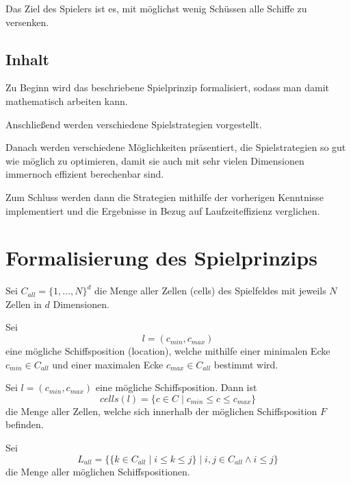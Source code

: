 \documentclass[a4paper,12pt]{llncs}
\numberwithin{equation}{section}
\newcommand{\bildbreite}[5]{
  \begin{figure}[htbp]
    \begin{center}
      \texttt{[image: \#1]}
      \caption[#5]{#4}
      \label{#3}
    \end{center}
  \end{figure}
}
\begin{document}
Das Ziel des Spielers ist es, mit möglichst wenig Schüssen alle Schiffe zu versenken.


\subsection{Inhalt}
Zu Beginn wird das beschriebene Spielprinzip formalisiert, sodass man damit mathematisch arbeiten kann.

Anschließend werden verschiedene Spielstrategien vorgestellt.

Danach werden verschiedene Möglichkeiten präsentiert, die Spielstrategien so gut wie möglich zu optimieren, damit sie auch mit sehr vielen Dimensionen immernoch effizient berechenbar sind.

Zum Schluss werden dann die Strategien mithilfe der vorherigen Kenntnisse implementiert und die Ergebnisse in Bezug auf Laufzeiteffizienz verglichen.

\section{Formalisierung des Spielprinzips}

\begin{definition}
Sei $C_{all}=\{1, \dots, N\}^d$ die Menge aller Zellen (cells) des Spielfeldes mit jeweils $N$ Zellen in $d$ Dimensionen.
\end{definition}

\begin{definition}
Sei
\[
l=(c_{min}, c_{max})
\]
eine mögliche Schiffsposition (location), welche mithilfe einer minimalen Ecke $c_{min} \in C_{all}$ und einer maximalen Ecke $c_{max} \in C_{all}$ bestimmt wird.
\end{definition}

\begin{definition}
Sei $l=(c_{min}, c_{max})$ eine mögliche Schiffsposition.
Dann ist
\[
cells(l)=
\{
c
\in
C
\mid
c_{min} \leq c \leq c_{max}
\}
\]
die Menge aller Zellen, welche sich innerhalb der möglichen Schiffsposition $F$ befinden.
\end{definition}

\begin{definition}
Sei 
\[
L_{all}=
\{
\{
k
\in
C_{all}
\mid
i \leq k \leq j
\}
\mid
i,j \in C_{all}
\wedge
i \leq j
\}
\] die Menge aller möglichen Schiffspositionen.
\end{definition}
\end{document}

